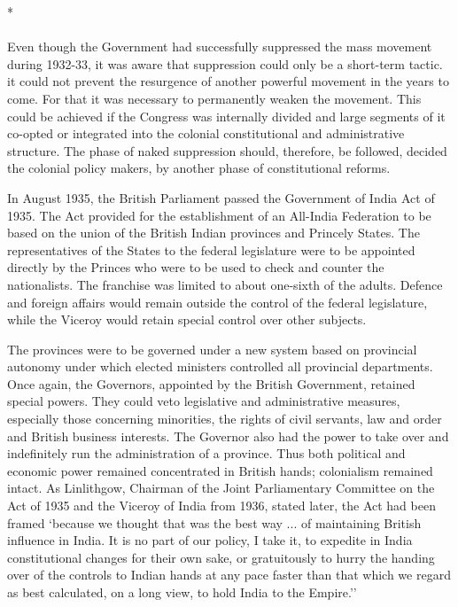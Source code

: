 \begin{center}*\end{center}

\paragraph*{}


Even though the Government had successfully suppressed the mass movement during 1932-33, it was aware that suppression could only be a short-term tactic. it could not prevent the resurgence of another powerful movement in the years to come. For that it was necessary to permanently weaken the movement. This could be achieved if the Congress was internally divided and large segments of it co-opted or integrated into the colonial constitutional and administrative structure. The phase of naked suppression should, therefore, be followed, decided the colonial policy makers, by another phase of constitutional reforms. 

In August 1935, the British Parliament passed the Government of India Act of 1935. The Act provided for the establishment of an All-India Federation to be based on the union of the British Indian provinces and Princely States. The representatives of the States to the federal legislature were to be appointed directly by the Princes who were to be used to check and counter the nationalists. The franchise was limited to about one-sixth of the adults. Defence and foreign affairs would remain outside the control of the federal legislature, while the Viceroy would retain special control over other subjects. 

The provinces were to be governed under a new system based on provincial autonomy under which elected ministers controlled all provincial departments. Once again, the Governors, appointed by the British Government, retained special powers. They could veto legislative and administrative measures, especially those concerning minorities, the rights of civil servants, law and order and British business interests. The Governor also had the power to take over and indefinitely run the administration of a province. Thus both political and economic power remained concentrated in British hands; colonialism remained intact. As Linlithgow, Chairman of the Joint Parliamentary Committee on the Act of 1935 and the Viceroy of India from 1936, stated later, the Act had been framed `because we thought that was the best way ... of maintaining British influence in India. It is no part of our policy, I take it, to expedite in India constitutional changes for their own sake, or gratuitously to hurry the handing over of the controls to Indian hands at any pace faster than that which we regard as best calculated, on a long view, to hold India to the Empire.'' 

